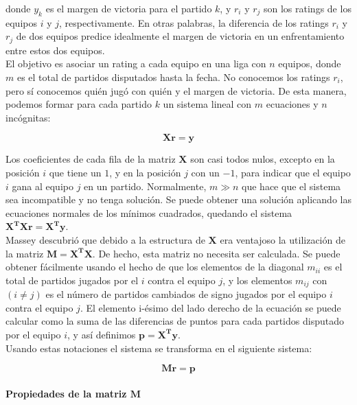 donde $y_k$ es el margen de victoria para el partido $k$, y $r_i$ y $r_j$ son los ratings de los equipos $i$ y $j$, respectivamente. En otras palabras, la diferencia de los ratings $r_i$ y $r_j$ de dos equipos predice idealmente el margen de victoria en un enfrentamiento entre estos dos equipos. \\

El objetivo es asociar un rating a cada equipo en una liga con $n$ equipos, donde $m$ es el total de partidos disputados hasta la fecha. No conocemos los ratings $r_i$, pero sí conocemos quién jugó con quién y el margen de victoria. De esta manera, podemos formar para cada partido $k$ un sistema lineal con $m$ ecuaciones y $n$ incógnitas:

\[\mathbf{X r } = \mathbf{y}\]

Los coeficientes de cada fila de la matriz $\mathbf{X}$ son casi todos nulos, excepto en la posición $i$ que tiene un $1$, y en la posición $j$ con un $-1$, para indicar que el equipo $i$ gana al equipo $j$ en un partido. Normalmente, $m \gg n$ que hace que el sistema sea incompatible y no tenga solución. Se puede obtener una solución aplicando las ecuaciones normales de los mínimos cuadrados, quedando el sistema $\mathbf{X^T X r} = \mathbf{X^T y}$. \\

Massey descubrió que debido a la estructura de $\mathbf{X}$ era ventajoso la utilización de la matriz $\mathbf{M} = \mathbf{X^T X}$. De hecho, esta matriz no necesita ser calculada. Se puede obtener fácilmente usando el hecho de que los elementos de la diagonal $m_{ii}$ es el total de partidos jugados por el $i$ contra el equipo $j$, y los elementos $m_{ij}$ con $(i \neq j)$ es el número de partidos cambiados de signo jugados por el equipo $i$ contra el equipo $j$. El elemento i-ésimo del lado derecho de la ecuación se puede calcular como la suma de las diferencias de puntos para cada partidos disputado por el equipo $i$, y así definimos $\mathbf{p} = \mathbf{X^T y}$.\\
Usando estas notaciones el sistema se transforma en el siguiente sistema:

\[ \mathbf{M r} = \mathbf{p} \]

\paragraph*{Propiedades de la matriz $\mathbf{M}$}

